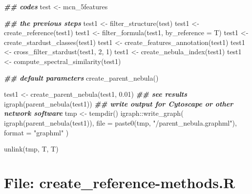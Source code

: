 \documentclass[
]{article}
\newenvironment{Shaded}{\begin{snugshade}}{\end{snugshade}}
\newcommand{\AttributeTok}[1]{\textcolor[rgb]{0.77,0.63,0.00}{#1}}
\newcommand{\DecValTok}[1]{\textcolor[rgb]{0.00,0.00,0.81}{#1}}
\newcommand{\DocumentationTok}[1]{\textcolor[rgb]{0.56,0.35,0.01}{\textbf{\textit{#1}}}}
\newcommand{\FloatTok}[1]{\textcolor[rgb]{0.00,0.00,0.81}{#1}}
\newcommand{\FunctionTok}[1]{\textcolor[rgb]{0.00,0.00,0.00}{#1}}
\newcommand{\NormalTok}[1]{#1}
\newcommand{\OtherTok}[1]{\textcolor[rgb]{0.56,0.35,0.01}{#1}}
\newcommand{\SpecialCharTok}[1]{\textcolor[rgb]{0.00,0.00,0.00}{#1}}
\newcommand{\StringTok}[1]{\textcolor[rgb]{0.31,0.60,0.02}{#1}}
\begin{document}
\begin{Shaded}
\begin{Highlighting}[]
\DocumentationTok{\#\# codes}
\NormalTok{test }\OtherTok{\textless{}{-}}\NormalTok{ mcn\_5features}

\DocumentationTok{\#\# the previous steps}
\NormalTok{test1 }\OtherTok{\textless{}{-}} \FunctionTok{filter\_structure}\NormalTok{(test)}
\NormalTok{test1 }\OtherTok{\textless{}{-}} \FunctionTok{create\_reference}\NormalTok{(test1)}
\NormalTok{test1 }\OtherTok{\textless{}{-}} \FunctionTok{filter\_formula}\NormalTok{(test1, }\AttributeTok{by\_reference =}\NormalTok{ T)}
\NormalTok{test1 }\OtherTok{\textless{}{-}} \FunctionTok{create\_stardust\_classes}\NormalTok{(test1)}
\NormalTok{test1 }\OtherTok{\textless{}{-}} \FunctionTok{create\_features\_annotation}\NormalTok{(test1)}
\NormalTok{test1 }\OtherTok{\textless{}{-}} \FunctionTok{cross\_filter\_stardust}\NormalTok{(test1, }\DecValTok{2}\NormalTok{, }\DecValTok{1}\NormalTok{)}
\NormalTok{test1 }\OtherTok{\textless{}{-}} \FunctionTok{create\_nebula\_index}\NormalTok{(test1)}
\NormalTok{test1 }\OtherTok{\textless{}{-}} \FunctionTok{compute\_spectral\_similarity}\NormalTok{(test1)}

\DocumentationTok{\#\# default parameters}
\FunctionTok{create\_parent\_nebula}\NormalTok{()}

\NormalTok{test1 }\OtherTok{\textless{}{-}} \FunctionTok{create\_parent\_nebula}\NormalTok{(test1, }\FloatTok{0.01}\NormalTok{)}
\DocumentationTok{\#\# see results}
\FunctionTok{igraph}\NormalTok{(}\FunctionTok{parent\_nebula}\NormalTok{(test1))}
\DocumentationTok{\#\# write output for \textquotesingle{}Cytoscape\textquotesingle{} or other network software}
\NormalTok{tmp }\OtherTok{\textless{}{-}} \FunctionTok{tempdir}\NormalTok{()}
\NormalTok{igraph}\SpecialCharTok{::}\FunctionTok{write\_graph}\NormalTok{(}
  \FunctionTok{igraph}\NormalTok{(}\FunctionTok{parent\_nebula}\NormalTok{(test1)),}
  \AttributeTok{file =} \FunctionTok{paste0}\NormalTok{(tmp, }\StringTok{"/parent\_nebula.graphml"}\NormalTok{),}
  \AttributeTok{format =} \StringTok{"graphml"}
\NormalTok{)}

\FunctionTok{unlink}\NormalTok{(tmp, T, T)}
\end{Highlighting}
\end{Shaded}

\hypertarget{file-create_reference-methods.r}{%
\section{File: create\_reference-methods.R}\label{file-create_reference-methods.r}}
\end{document}
